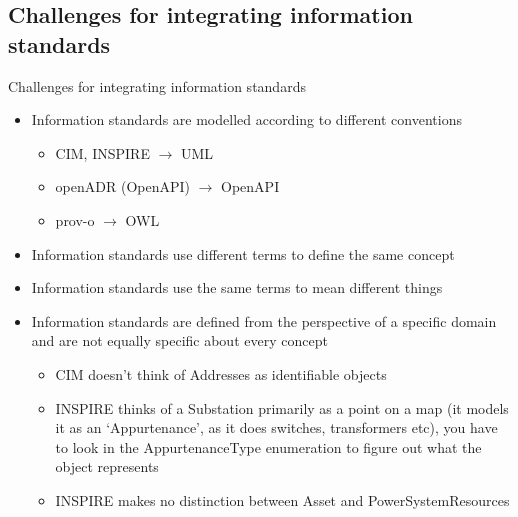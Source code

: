 \subsection{Challenges for integrating information standards}
\begin{frame}{Challenges for integrating information standards}

    \begin{itemize}
        \item Information standards are modelled according to different conventions
        \begin{itemize}
            \item CIM, INSPIRE $\rightarrow$ UML
            \item openADR (OpenAPI) $\rightarrow$ OpenAPI
            \item prov-o $\rightarrow$  OWL
        \end{itemize}
        \pause
        \item Information standards use different terms to define the same concept
        \item Information standards use the same terms to mean different things
        \pause
        \item Information standards are defined from the perspective of a specific domain and are not equally specific about every concept
        \begin{itemize}
            \item CIM doesn't think of Addresses as identifiable objects
            \item INSPIRE thinks of a Substation primarily as a point on a map (it models it as an `Appurtenance', as it does switches, transformers etc), you have to look in the AppurtenanceType enumeration to figure out what the object represents
            \item INSPIRE makes no distinction between Asset and PowerSystemResources
        \end{itemize}
    \end{itemize}
    
\end{frame}